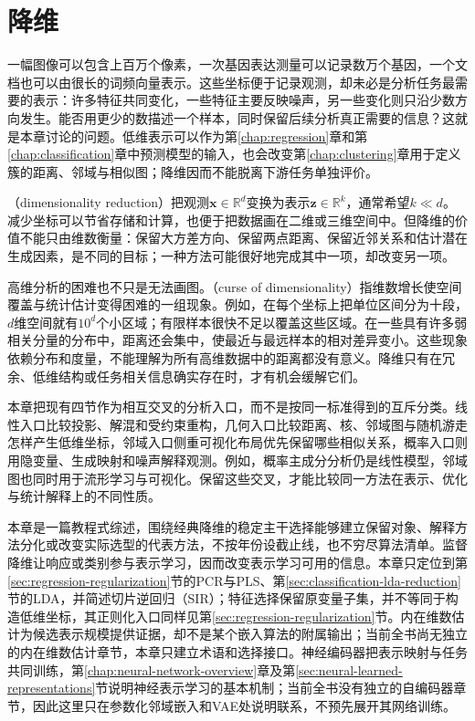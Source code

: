 \chapter{降维}
\label{chap:dimensionality-reduction}

一幅图像可以包含上百万个像素，一次基因表达测量可以记录数万个基因，一个文档也可以由很长的词频向量表示。这些坐标便于记录观测，却未必是分析任务最需要的表示：许多特征共同变化，一些特征主要反映噪声，另一些变化则只沿少数方向发生。能否用更少的数描述一个样本，同时保留后续分析真正需要的信息？这就是本章讨论的问题。低维表示可以作为第\ref{chap:regression}章和第\ref{chap:classification}章中预测模型的输入，也会改变第\ref{chap:clustering}章用于定义簇的距离、邻域与相似图；降维因而不能脱离下游任务单独评价。

（dimensionality reduction）把观测$\bm{x}\in\mathbb{R}^{d}$变换为表示$\bm{z}\in\mathbb{R}^{k}$，通常希望$k\ll d$。减少坐标可以节省存储和计算，也便于把数据画在二维或三维空间中。但降维的价值不能只由维数衡量：保留大方差方向、保留两点距离、保留近邻关系和估计潜在生成因素，是不同的目标；一种方法可能很好地完成其中一项，却改变另一项。

高维分析的困难也不只是无法画图。（curse of dimensionality）指维数增长使空间覆盖与统计估计变得困难的一组现象。例如，在每个坐标上把单位区间分为十段，$d$维空间就有$10^d$个小区域；有限样本很快不足以覆盖这些区域。在一些具有许多弱相关分量的分布中，距离还会集中，使最近与最远样本的相对差异变小。这些现象依赖分布和度量，不能理解为所有高维数据中的距离都没有意义。降维只有在冗余、低维结构或任务相关信息确实存在时，才有机会缓解它们。

本章把现有四节作为相互交叉的分析入口，而不是按同一标准得到的互斥分类。线性入口比较投影、解混和受约束重构，几何入口比较距离、核、邻域图与随机游走怎样产生低维坐标，邻域入口侧重可视化布局优先保留哪些相似关系，概率入口则用隐变量、生成映射和噪声解释观测。例如，概率主成分分析仍是线性模型，邻域图也同时用于流形学习与可视化。保留这些交叉，才能比较同一方法在表示、优化与统计解释上的不同性质。

本章是一篇教程式综述，围绕经典降维的稳定主干选择能够建立保留对象、解释方法分化或改变实际选型的代表方法，不按年份设截止线，也不穷尽算法清单。监督降维让响应或类别参与表示学习，因而改变表示学习可用的信息。本章只定位到第\ref{sec:regression-regularization}节的PCR与PLS、第\ref{sec:classification-lda-reduction}节的LDA，并简述切片逆回归（SIR）；特征选择保留原变量子集，并不等同于构造低维坐标，其正则化入口同样见第\ref{sec:regression-regularization}节。内在维数估计为候选表示规模提供证据，却不是某个嵌入算法的附属输出；当前全书尚无独立的内在维数估计章节，本章只建立术语和选择接口。神经编码器把表示映射与任务共同训练，第\ref{chap:neural-network-overview}章及第\ref{sec:neural-learned-representations}节说明神经表示学习的基本机制；当前全书没有独立的自编码器章节，因此这里只在参数化邻域嵌入和VAE处说明联系，不预先展开其网络训练。

